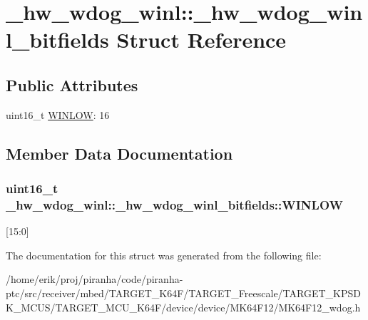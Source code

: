 \hypertarget{struct__hw__wdog__winl_1_1__hw__wdog__winl__bitfields}{}\section{\+\_\+hw\+\_\+wdog\+\_\+winl\+:\+:\+\_\+hw\+\_\+wdog\+\_\+winl\+\_\+bitfields Struct Reference}
\label{struct__hw__wdog__winl_1_1__hw__wdog__winl__bitfields}
\subsection*{Public Attributes}
\begin{DoxyCompactItemize}
\item 
uint16\+\_\+t \hyperlink{struct__hw__wdog__winl_1_1__hw__wdog__winl__bitfields_a1eb4292f7ea5e8b47a38402bdcbfdf02}{W\+I\+N\+L\+OW}\+: 16
\end{DoxyCompactItemize}


\subsection{Member Data Documentation}
\subsubsection[{\texorpdfstring{W\+I\+N\+L\+OW}{WINLOW}}]{\setlength{\rightskip}{0pt plus 5cm}uint16\+\_\+t \+\_\+hw\+\_\+wdog\+\_\+winl\+::\+\_\+hw\+\_\+wdog\+\_\+winl\+\_\+bitfields\+::\+W\+I\+N\+L\+OW}\hypertarget{struct__hw__wdog__winl_1_1__hw__wdog__winl__bitfields_a1eb4292f7ea5e8b47a38402bdcbfdf02}{}\label{struct__hw__wdog__winl_1_1__hw__wdog__winl__bitfields_a1eb4292f7ea5e8b47a38402bdcbfdf02}
\mbox{[}15\+:0\mbox{]} 

The documentation for this struct was generated from the following file\+:\begin{DoxyCompactItemize}
\item 
/home/erik/proj/piranha/code/piranha-\/ptc/src/receiver/mbed/\+T\+A\+R\+G\+E\+T\+\_\+\+K64\+F/\+T\+A\+R\+G\+E\+T\+\_\+\+Freescale/\+T\+A\+R\+G\+E\+T\+\_\+\+K\+P\+S\+D\+K\+\_\+\+M\+C\+U\+S/\+T\+A\+R\+G\+E\+T\+\_\+\+M\+C\+U\+\_\+\+K64\+F/device/device/\+M\+K64\+F12/M\+K64\+F12\+\_\+wdog.\+h\end{DoxyCompactItemize}
